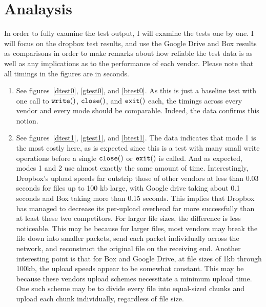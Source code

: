 \documentclass[pageno]{jpaper}
\begin{document}
\section{Analaysis}
\label{sec:analysis}
In order to fully examine the test output, I will examine the tests one by one. I will focus on the dropbox test results, and use the Google Drive and Box results as comparisons in order to make remarks about how reliable the test data is as well as any implications as to the performance of each vendor. Please note that all timings in the figures are in seconds.
\begin{enumerate}[label=Test \arabic*:,start=0]
\item See figures~\ref{dtest0}, \ref{gtest0}, and \ref{btest0}. As this is just a baseline test with one call to $\tt{write()}$, $\tt{close()}$, and $\tt{exit()}$ each, the timings across every vendor and every mode should be comparable. Indeed, the data confirms this notion.

\FloatBarrier
\begin{center}
\CT
{}\quad
{}\quad
{}
\end{center}

\item See figures~\ref{dtest1}, \ref{gtest1}, and \ref{btest1}. The data indicates that mode 1 is the most costly here, as is expected since this is a test with many small write operations before a single $\tt{close()}$ or $\tt{exit()}$ is called. And as expected, modes 1 and 2 use almost exactly the same amount of time. Interestingly, Dropbox's upload speeds far outstrip those of other vendors at less than 0.03 seconds for files up to 100 kb large, with Google drive taking about 0.1 seconds and Box taking more than 0.15 seconds. This implies that Dropbox has managed to decrease its per-upload overhead far more successfully than at least these two competitors. For larger file sizes, the difference is less noticeable. This may be because for larger files, most vendors may break the file down into smaller packets, send each packet individually across the network, and reconstruct the original file on the receiving end. Another interesting point is that for Box and Google Drive, at file sizes of 1kb through 100kb, the upload speeds appear to be somewhat constant. This may be because these vendors upload schemes necessitate a minimum upload time. One such scheme may be to divide every file into equal-sized chunks and upload each chunk individually, regardless of file size.


\end{enumerate}
\end{document}
